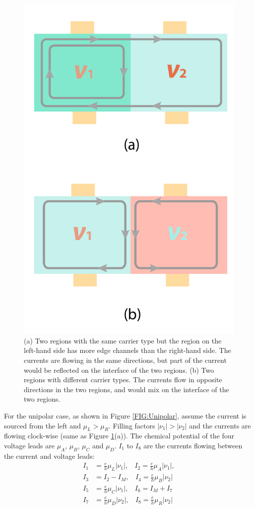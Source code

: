 \documentclass[pdflatex, sectionletters, 12pt]{pittetd}    %
\begin{document}
\begin{figure}[h!]
	\centering
	\includegraphics[width=.4\textwidth]{Drawing/Mixing.pdf}
	\caption{(a) Two regions with the same carrier type but the region on the left-hand side has more edge channels than the right-hand side. The currents are flowing in the same directions, but part of the current would be reflected on the interface of the two regions. (b) Two regions with different carrier types. The currents flow in opposite directions in the two regions, and would mix on the interface of the two regions.}
	\label{FIG:Mixing}
\end{figure}

For the unipolar case, as shown in Figure \ref{FIG:Unipolar}, assume the current is sourced from the left and $\mu_L > \mu_R$. Filling factors $|\nu_1| > |\nu_2|$ and the currents are flowing clock-wise (same as Figure \ref{FIG:Mixing}(a)). The chemical potential of the four voltage leads are $\mu_A$, $\mu_B$, $\mu_C$ and $\mu_D$. $I_1$ to $I_8$ are the currents flowing between the current and voltage leads:
\begin{equation}
\label{EQN:MixCurr1}
\begin{split}
I_1 & = \frac{e}{h}\mu_L|\nu_1|, \ \ \ \  I_2 = \frac{e}{h}\mu_A|\nu_1|, \\
I_3 & = I_2 - I_M, \ \ \ \ I_4 = \frac{e}{h}\mu_B|\nu_2| \\
I_5 & = \frac{e}{h}\mu_C|\nu_1|, \ \ \ \ I_6 = I_M + I_7 \\
I_7 & = \frac{e}{h}\mu_D|\nu_2|, \ \ \ \ I_8 = \frac{e}{h}\mu_R|\nu_2|
\end{split}
\end{equation}
\end{document}
